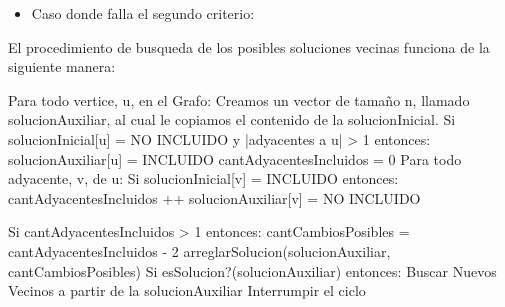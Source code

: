 \begin{itemize}
	\item Caso donde falla el segundo criterio:
    

\end{itemize}

El procedimiento de busqueda de los posibles soluciones vecinas funciona de la siguiente manera:

\begin{codesnippet}
Para todo vertice, u, en el Grafo:
  Creamos un vector de tamaño n, llamado solucionAuxiliar, al cual le copiamos 
  el contenido de la solucionInicial.
  Si solucionInicial[u] = NO INCLUIDO y |adyacentes a u| > 1 entonces:
     solucionAuxiliar[u] = INCLUIDO
     cantAdyacentesIncluidos = 0
     Para todo adyacente, v, de u:
         Si solucionInicial[v] = INCLUIDO entonces:
             cantAdyacentesIncluidos ++
             solucionAuxiliar[v] = NO INCLUIDO
  
  Si cantAdyacentesIncluidos > 1 entonces:
     cantCambiosPosibles = cantAdyacentesIncluidos - 2
     arreglarSolucion(solucionAuxiliar, cantCambiosPosibles)
     Si esSolucion?(solucionAuxiliar) entonces:
       Buscar Nuevos Vecinos a partir de la solucionAuxiliar
       Interrumpir el ciclo
     
\end{codesnippet}

